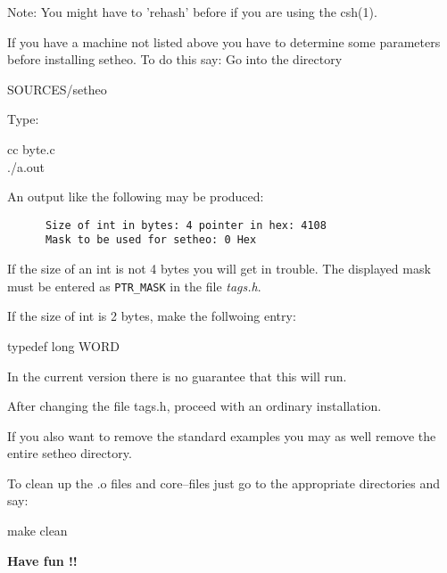 Note: You might have to 'rehash' before if you are using the csh(1).


If you have a machine not listed above you have to determine some
parameters before installing setheo. To do this say:
Go into the directory \vspace{-2mm}
\begin{center}
                SOURCES/setheo
\end{center} \vspace{-2mm}

Type: \vspace{-2mm}
\begin{center}
                cc byte.c \\
                ./a.out
\end{center} \vspace{-2mm}

An output like the following may be produced: \vspace{-2mm}

\begin{verbatim}
      Size of int in bytes: 4 pointer in hex: 4108
      Mask to be used for setheo: 0 Hex
\end{verbatim}

If the size of an int is not 4 bytes you will get in trouble.
The displayed mask must be entered as
 {\tt PTR\_MASK}
in the file {\it tags.h}.

If the size of int is 2 bytes, make the follwoing entry: \vspace{-2mm}
\begin{center}
               typedef long WORD
\end{center} \vspace{-2mm}

In the current version there is no guarantee that this will run.

After changing the file tags.h, proceed with an ordinary installation.



If you also want to remove the standard examples
you may as well remove the entire setheo directory.

To clean up the .o files and core--files
just go to the appropriate directories
and say: \vspace{-2mm}
\begin{center}
                make clean
\end{center}


\begin{center}
{\bf Have fun !!}
\end{center}
